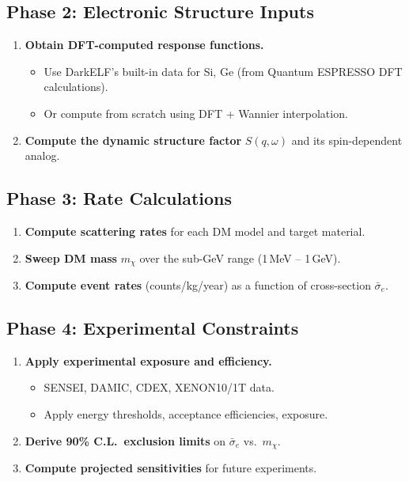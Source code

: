 \documentclass[11pt,a4paper]{article}
\begin{document}
\subsection{Phase 2: Electronic Structure Inputs}
\begin{enumerate}[label=\textbf{2.\arabic*}]
  \item \textbf{Obtain DFT-computed response functions.}
    \begin{itemize}
      \item Use DarkELF's built-in data for Si, Ge (from Quantum ESPRESSO DFT calculations).
      \item Or compute from scratch using DFT + Wannier interpolation.
    \end{itemize}
  \item \textbf{Compute the dynamic structure factor} $S(q, \omega)$ and its spin-dependent analog.
\end{enumerate}

\subsection{Phase 3: Rate Calculations}
\begin{enumerate}[label=\textbf{3.\arabic*}]
  \item \textbf{Compute scattering rates} for each DM model and target material.
  \item \textbf{Sweep DM mass} $m_\chi$ over the sub-GeV range (1\,MeV -- 1\,GeV).
  \item \textbf{Compute event rates} (counts/kg/year) as a function of cross-section $\bar{\sigma}_e$.
\end{enumerate}

\subsection{Phase 4: Experimental Constraints}
\begin{enumerate}[label=\textbf{4.\arabic*}]
  \item \textbf{Apply experimental exposure and efficiency.}
    \begin{itemize}
      \item SENSEI, DAMIC, CDEX, XENON10/1T data.
      \item Apply energy thresholds, acceptance efficiencies, exposure.
    \end{itemize}
  \item \textbf{Derive 90\% C.L.\ exclusion limits} on $\bar{\sigma}_e$ vs.\ $m_\chi$.
  \item \textbf{Compute projected sensitivities} for future experiments.
\end{enumerate}
\end{document}
